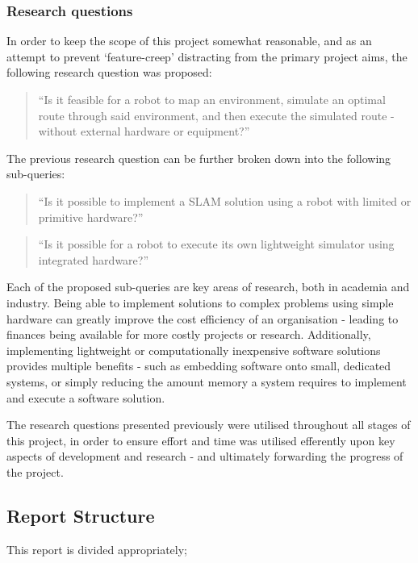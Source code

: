 \subsubsection{Research questions} \label{sec_res_q}
In order to keep the scope of this project somewhat reasonable, and as an
attempt to prevent `feature-creep' distracting from the primary project aims,
the following research question was proposed:
\begin{quote}
    ``Is it feasible for a robot to map an environment, simulate an optimal
    route through said environment, and then execute the simulated route -
    without external hardware or equipment?''
\end{quote}

The previous research question can be further broken down into the following
sub-queries:

\begin{quote}
    ``Is it possible to implement a SLAM solution using a robot with limited or
    primitive hardware?''
\end{quote}

\begin{quote}
    ``Is it possible for a robot to execute its own lightweight simulator using
    integrated hardware?''
\end{quote}

Each of the proposed sub-queries are key areas of research, both in academia
and industry.
Being able to implement solutions to complex problems using simple hardware
can greatly improve the cost efficiency of an organisation - leading to
finances being available for more costly projects or research. 
Additionally, implementing lightweight or computationally inexpensive software
solutions provides multiple benefits - such as embedding software onto small,
dedicated systems, or simply reducing the amount memory a system requires to
implement and execute a software solution. 

The research questions presented previously were utilised throughout all
stages of this project, in order to ensure effort and time was utilised
efferently upon key aspects of development and research - and ultimately
forwarding the progress of the project.

\subsection{Report Structure}
This report is divided appropriately;

